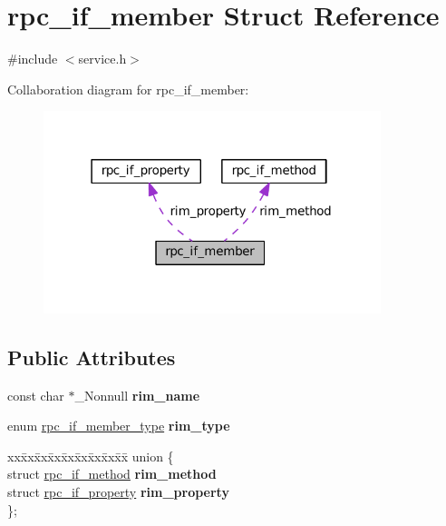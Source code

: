 \hypertarget{structrpc__if__member}{}\section{rpc\+\_\+if\+\_\+member Struct Reference}
\label{structrpc__if__member}


{\ttfamily \#include $<$service.\+h$>$}



Collaboration diagram for rpc\+\_\+if\+\_\+member\+:
\nopagebreak
\begin{figure}[H]
\begin{center}
\leavevmode
\includegraphics[width=279pt]{structrpc__if__member__coll__graph}
\end{center}
\end{figure}
\subsection*{Public Attributes}
\begin{DoxyCompactItemize}
\item 
\mbox{\label{structrpc__if__member_a656607611d627c965972e4153523287e}} 
const char $\ast$\+\_\+\+Nonnull {\bfseries rim\+\_\+name}
\item 
\mbox{\label{structrpc__if__member_a0ffdb5e81a707932149376d01c716b10}} 
enum \hyperlink{service_8h_a543850b4e1fac65207114c51d9c3f1a4}{rpc\+\_\+if\+\_\+member\+\_\+type} {\bfseries rim\+\_\+type}
\item 
\mbox{\label{structrpc__if__member_a7c950b405b6852b3038ae847d0b7e2e0}} 
\begin{tabbing}
xx\=xx\=xx\=xx\=xx\=xx\=xx\=xx\=xx\=\kill
union \{\\
\>struct \hyperlink{structrpc__if__method}{rpc\_if\_method} {\bfseries rim\_method}\\
\>struct \hyperlink{structrpc__if__property}{rpc\_if\_property} {\bfseries rim\_property}\\
\}; \\

\end{tabbing}\end{DoxyCompactItemize}


